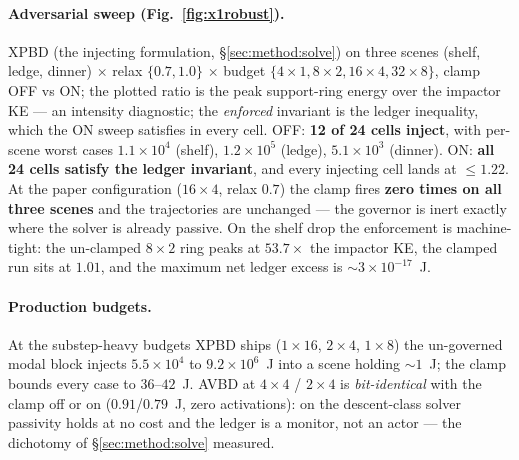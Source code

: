 \paragraph*{Adversarial sweep (Fig.~\ref{fig:x1robust}).} XPBD (the injecting
formulation, \S\ref{sec:method:solve}) on three scenes (shelf, ledge, dinner)
$\times$ relax $\{0.7, 1.0\}$ $\times$ budget $\{4{\times}1, 8{\times}2,
16{\times}4, 32{\times}8\}$, clamp OFF vs ON; the plotted ratio is the peak
support-ring energy over the impactor KE --- an intensity diagnostic; the
\emph{enforced} invariant is the ledger inequality, which the ON sweep
satisfies in every cell. OFF: \textbf{12 of 24 cells inject},
with per-scene worst cases $1.1\times10^{4}$ (shelf), $1.2\times10^{5}$
(ledge), $5.1\times10^{3}$ (dinner).
ON: \textbf{all 24 cells satisfy the
ledger invariant}, and every injecting cell lands at $\le 1.22$. At the paper
configuration ($16{\times}4$, relax $0.7$) the clamp fires \textbf{zero times
on all three scenes} and the trajectories are unchanged --- the governor is
inert exactly where the solver is already passive. On the shelf drop the
enforcement is machine-tight: the un-clamped $8{\times}2$ ring peaks at
$53.7\times$ the impactor KE, the clamped run sits at $1.01$, and the maximum
net ledger excess is ${\sim}3\times10^{-17}$~J.

\paragraph*{Production budgets.} At the substep-heavy budgets XPBD ships
($1{\times}16$, $2{\times}4$, $1{\times}8$) the un-governed modal block
injects $5.5\times10^{4}$ to $9.2\times10^{6}$~J into a scene holding
${\sim}1$~J; the clamp bounds every case to $36$--$42$~J. AVBD at
$4{\times}4$ / $2{\times}4$ is \emph{bit-identical} with the clamp off or on
($0.91$/$0.79$~J, zero activations): on the descent-class solver passivity
holds at no cost and the ledger is a monitor, not an actor --- the dichotomy of
\S\ref{sec:method:solve} measured.

